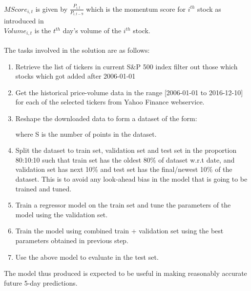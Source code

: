 \documentclass[10pt]{report}
\begin{document}
$MScore_{i,t}$ is given by $\frac{P_{i,t}}{P_{i, t-9}}$ which is the momentum score for $i^{th}$ stock as introduced in \cite{mlfortrading}\\
$Volume_{i,t}$ is the $t^{th}$ day's volume of the $i^{th}$ stock.\\
\\
The tasks involved in the solution are as follows:
\begin{enumerate}
\item Retrieve the list of tickers in current S\&P 500 index filter out those which stocks which got added after 2006-01-01
\item Get the historical price-volume data in the range [2006-01-01 to 2016-12-10] for each of the selected tickers from Yahoo Finance webservice.
\item Reshape the downloaded data to form a dataset of the form: 
\begin{align*}
[&(feature_1, feature_2, ..., feature_n, target)_{t=0},\\
 &(feature_1, feature_2, ..., feature_n, target)_{t=1},\\
 &...\\
 &(feature_1, feature_2, ..., feature_n, target)_{t=S}]\\
\end{align*} where S is the number of points in the dataset.
\item Split the dataset to train set, validation set and test set in the proportion 80:10:10 such that train set has the oldest 80\% of dataset w.r.t date, and validation set has next 10\% and test set has the final/newest 10\% of the dataset. This is to avoid any look-ahead bias in the model that is going to be trained and tuned.
\item Train a regressor model on the train set and tune the parameters of the model using the validation set.
\item Train the model using combined train + validation set using the best parameters obtained in previous step.
\item Use the above model to evaluate in the test set.
\end{enumerate}
The model thus produced is expected to be useful in making reasonably accurate future 5-day predictions.
\end{document}

